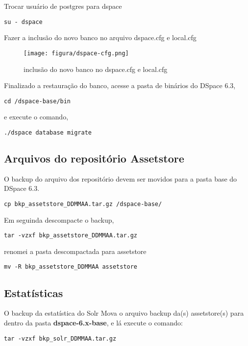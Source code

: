 \documentclass[12pt,hidelinks]{article}
\begin{document}
Trocar usuário de postgres para dspace

\begin{verbatim}
su - dspace
\end{verbatim}

Fazer a inclusão do novo banco no arquivo dspace.cfg e local.cfg

\begin{figure}[!htp]
                \centering
                \texttt{[image: figura/dspace-cfg.png]}
                \caption{inclusão do novo banco no dspace.cfg e local.cfg}
            \label{Rotulo}
          \end{figure}

Finalizado a restauração do banco, acesse a pasta de binários do DSpace 6.3,
\begin{verbatim}
cd /dspace-base/bin
\end{verbatim}
e execute o comando,
\begin{verbatim}
./dspace database migrate
\end{verbatim}

\subsection{Arquivos do repositório Assetstore}

O backup do arquivo dos repositório devem ser movidos para a pasta base do DSpace 6.3.
\begin{verbatim}
cp bkp_assetstore_DDMMAA.tar.gz /dspace-base/
\end{verbatim}
Em seguinda descompacte o backup,
\begin{verbatim}
tar -vzxf bkp_assetstore_DDMMAA.tar.gz
\end{verbatim}
renomei a pasta descompactada para assetstore
\begin{verbatim}
mv -R bkp_assetstore_DDMMAA assetstore 
\end{verbatim}


\subsection{Estatísticas}

O backup da estatística do Solr
\textbullet \hspace{6pt} Mova o arquivo backup da(s) assetstore(s) para dentro da pasta \textbf{dspace-6.x-base}, e lá execute o comando:

\begin{verbatim}
tar -vzxf bkp_solr_DDMMAA.tar.gz
\end{verbatim}
\end{document}
